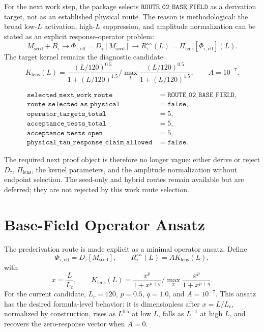 \documentclass[11pt]{article}
\begin{document}
For the next work step, the package selects \(\texttt{ROUTE\_02\_BASE\_FIELD}\)
as a derivation target, not as an established physical route. The reason is
methodological: the broad low-\(L\) activation, high-\(L\) suppression, and
amplitude normalization can be stated as an explicit response-operator problem:
\[
M_{\mathrm{seed}}+B_{\tau}
\rightarrow
\Phi_{\tau,\mathrm{eff}}=D_{\tau}[M_{\mathrm{seed}}]
\rightarrow
R_{\tau}^{\kappa\kappa}(L)
=\Pi_{\mathrm{lens}}[\Phi_{\tau,\mathrm{eff}}](L).
\]
The target kernel remains the diagnostic candidate
\[
K_{\mathrm{lens}}(L)=
\frac{(L/120)^{0.5}}{1+(L/120)^{1.5}}\bigg/
\max_L\frac{(L/120)^{0.5}}{1+(L/120)^{1.5}},
\qquad A=10^{-7}.
\]

\[
\begin{array}{ll}
\texttt{selected\_next\_work\_route} &= \texttt{ROUTE\_02\_BASE\_FIELD},\\
\texttt{route\_selected\_as\_physical} &= \texttt{false},\\
\texttt{operator\_targets\_total} &= 5,\\
\texttt{acceptance\_tests\_total} &= 5,\\
\texttt{acceptance\_tests\_open} &= 5,\\
\texttt{physical\_tau\_response\_claim\_allowed} &= \texttt{false}.
\end{array}
\]

The required next proof object is therefore no longer vague: either derive or
reject \(D_{\tau}\), \(\Pi_{\mathrm{lens}}\), the kernel parameters, and the
amplitude normalization without endpoint selection. The seed-only and hybrid
routes remain available but are deferred; they are not rejected by this work
route selection.

\section{Base-Field Operator Ansatz}

The prederivation route is made explicit as a minimal operator ansatz. Define
\[
\Phi_{\tau,\mathrm{eff}}=D_{\tau}[M_{\mathrm{seed}}],
\qquad
R_{\tau}^{\kappa\kappa}(L)=A K_{\mathrm{lens}}(L),
\]
with
\[
x=\frac{L}{L_c},\qquad
K_{\mathrm{lens}}(L)=
\frac{x^p}{1+x^{p+q}}\bigg/
\max_x\frac{x^p}{1+x^{p+q}}.
\]
For the current candidate, \(L_c=120\), \(p=0.5\), \(q=1.0\), and
\(A=10^{-7}\). This ansatz has the desired formula-level behavior: it is
dimensionless after \(x=L/L_c\), normalized by construction, rises as
\(L^{0.5}\) at low \(L\), falls as \(L^{-1}\) at high \(L\), and recovers the
zero-response vector when \(A=0\).
\end{document}
